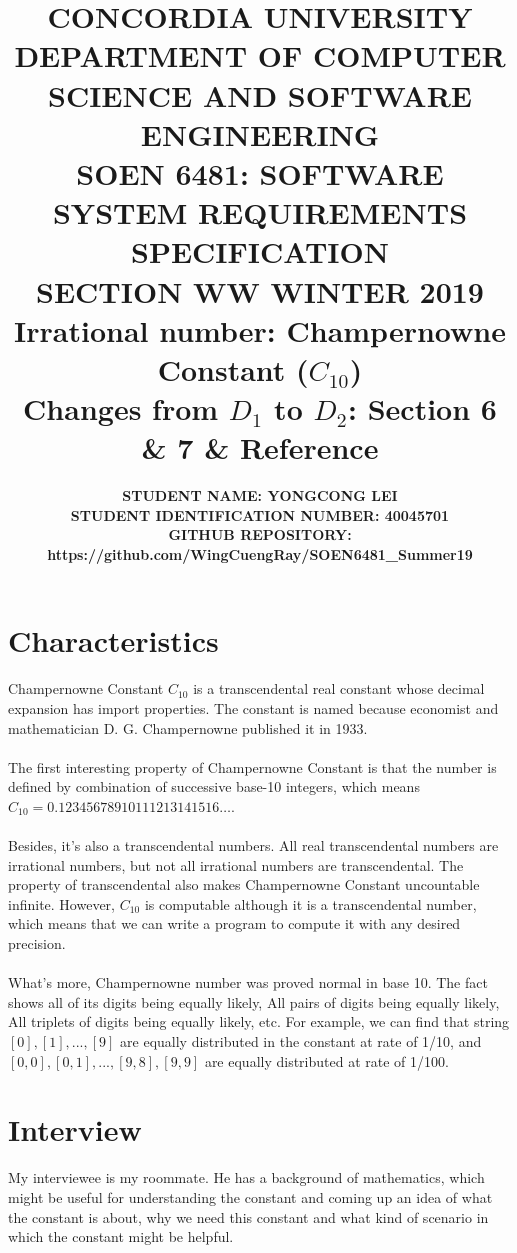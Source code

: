 \documentclass[10pt]{article}
\title{{\large \textbf{CONCORDIA UNIVERSITY \\ DEPARTMENT OF COMPUTER SCIENCE AND SOFTWARE ENGINEERING \\ SOEN 6481: SOFTWARE SYSTEM REQUIREMENTS SPECIFICATION \\ SECTION WW WINTER 2019 \\ Irrational number: Champernowne Constant ($C_{10}$) \\ Changes from $D_1$ to $D_2$: Section 6 \& 7 \& Reference }}}
\author{\normalsize \textbf {STUDENT NAME: YONGCONG LEI} \\ \normalsize \textbf{STUDENT IDENTIFICATION NUMBER: 40045701}   \\ \normalsize \textbf{GITHUB REPOSITORY: https://github.com/WingCuengRay/SOEN6481\_Summer19} }
\date{}
\begin{document}
\maketitle

\section{Characteristics}
\paragraph{}
Champernowne Constant $C_{10}$ is a transcendental real constant whose decimal expansion has import properties. The constant is named because economist and mathematician D. G. Champernowne published it in 1933.

\paragraph{}
The first interesting property of Champernowne Constant is that the number is defined by combination of successive base-10 integers, which means $C_{10} = 0.12345678910111213141516…$.

\paragraph{}
Besides, it's also a transcendental numbers. All real transcendental numbers are irrational numbers, but not all irrational numbers are transcendental. The property of transcendental also makes Champernowne Constant uncountable infinite. However, $C_{10}$ is computable  although it is a transcendental number, which means that we can write a program to compute it with any desired precision.

\paragraph{}
What's more, Champernowne number was proved normal in base 10. The fact shows all of its digits being equally likely, All pairs of digits being equally likely, All triplets of digits being equally likely, etc. For example, we can find that string $[0], [1], ..., [9]$ are equally distributed in the constant at rate of 1/10, and $ [0,0],[0,1],...,[9,8],[9,9]$ are equally distributed at rate of 1/100.

\pagebreak
\section{Interview}
My interviewee is my roommate. He has a background of mathematics, which might be useful for understanding the constant and coming up an idea of what the constant is about, why we need this constant and what kind of scenario in which the constant might be helpful.
\end{document}
